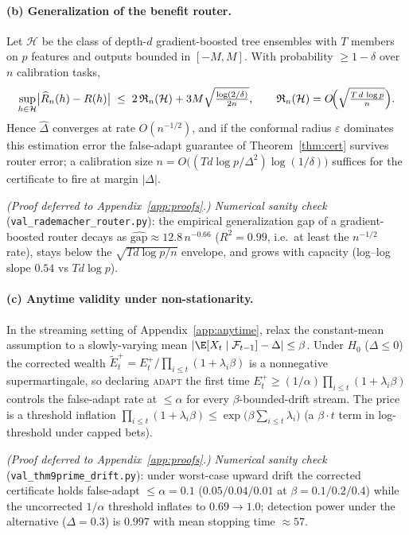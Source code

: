 \paragraph{(b) Generalization of the benefit router.}
\begin{theorem}\label{thm:router-rad}
Let $\mathcal H$ be the class of depth-$d$ gradient-boosted tree ensembles with $T$ members on $p$
features and outputs bounded in $[-M,M]$. With probability $\ge1-\delta$ over $n$ calibration tasks,
\[
\sup_{h\in\mathcal H}\bigl|\widehat R_n(h)-R(h)\bigr|\;\le\;2\,\mathfrak R_n(\mathcal H)+3M\sqrt{\tfrac{\log(2/\delta)}{2n}},
\qquad \mathfrak R_n(\mathcal H)=O\!\Bigl(\sqrt{\tfrac{T\,d\,\log p}{n}}\Bigr).
\]
Hence $\widehat\Delta$ converges at rate $O(n^{-1/2})$, and if the conformal radius $\varepsilon$
dominates this estimation error the false-adapt guarantee of Theorem~\ref{thm:cert} survives router
error; a calibration size $n=O\!\bigl((T d\log p/\Delta^2)\log(1/\delta)\bigr)$ suffices for the
certificate to fire at margin $|\Delta|$.
\end{theorem}
\emph{(Proof deferred to Appendix~\ref{app:proofs}.)}
\noindent\emph{Numerical sanity check} (\texttt{val\_rademacher\_router.py}): the empirical
generalization gap of a gradient-boosted router decays as
$\widehat{\mathrm{gap}}\approx 12.8\,n^{-0.66}$ ($R^2=0.99$, i.e.\ at least the $n^{-1/2}$ rate),
stays below the $\sqrt{Td\log p/n}$ envelope, and grows with capacity (log--log slope $0.54$ vs
$Td\log p$).

\paragraph{(c) Anytime validity under non-stationarity.}
\begin{theorem}\label{thm:anytime-drift}
In the streaming setting of Appendix~\ref{app:anytime}, relax the constant-mean assumption to a
slowly-varying mean $|\E[X_t\mid\mathcal F_{t-1}]-\Delta|\le\beta$. Under $H_0$ ($\Delta\le0$) the
corrected wealth $\widetilde E_t^{+}=E_t^{+}/\prod_{i\le t}(1+\lambda_i\beta)$ is a nonnegative
supermartingale, so declaring \textsc{adapt} the first time
$E_t^{+}\ge(1/\alpha)\prod_{i\le t}(1+\lambda_i\beta)$ controls the false-adapt rate at $\le\alpha$
for every $\beta$-bounded-drift stream. The price is a threshold inflation
$\prod_{i\le t}(1+\lambda_i\beta)\le\exp\!\bigl(\beta\textstyle\sum_{i\le t}\lambda_i\bigr)$ (a
$\beta\!\cdot\!t$ term in log-threshold under capped bets).
\end{theorem}
\emph{(Proof deferred to Appendix~\ref{app:proofs}.)}
\noindent\emph{Numerical sanity check} (\texttt{val\_thm9prime\_drift.py}): under worst-case upward
drift the corrected certificate holds false-adapt $\le\alpha{=}0.1$ ($0.05/0.04/0.01$ at
$\beta=0.1/0.2/0.4$) while the uncorrected $1/\alpha$ threshold inflates to $0.69\!\to\!1.0$;
detection power under the alternative ($\Delta{=}0.3$) is $0.997$ with mean stopping time $\approx57$.
